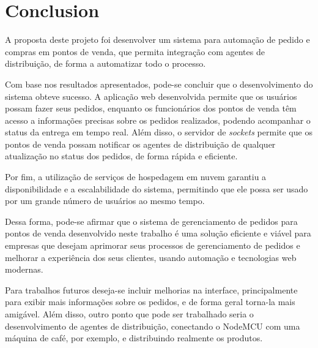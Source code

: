 \chapter{Conclusion}\label{cap:conclusao}



A proposta deste projeto foi desenvolver um sistema para automação de pedido e compras em pontos de venda, que permita integração com agentes de distribuição, de forma a automatizar todo o processo.

Com base nos resultados apresentados, pode-se concluir que o desenvolvimento do sistema obteve sucesso. A aplicação web desenvolvida permite que os usuários possam fazer seus pedidos, enquanto os funcionários dos pontos de venda têm acesso a informações precisas sobre os pedidos realizados, podendo acompanhar o status da entrega em tempo real. Além disso, o servidor de \textit{sockets} permite que os pontos de venda possam notificar os agentes de distribuição de qualquer atualização no status dos pedidos, de forma rápida e eficiente.

Por fim, a utilização de serviços de hospedagem em nuvem garantiu a disponibilidade e a escalabilidade do sistema, permitindo que ele possa ser usado por um grande número de usuários ao mesmo tempo.

Dessa forma, pode-se afirmar que o sistema de gerenciamento de pedidos para pontos de venda desenvolvido neste trabalho é uma solução eficiente e viável para empresas que desejam aprimorar seus processos de gerenciamento de pedidos e melhorar a experiência dos seus clientes, usando automação e tecnologias web modernas.

Para trabalhos futuros deseja-se incluir melhorias na interface, principalmente para exibir mais informações sobre os pedidos, e de forma geral torna-la mais amigável. Além disso, outro ponto que pode ser trabalhado seria o desenvolvimento de agentes de distribuição, conectando o NodeMCU com uma máquina de café, por exemplo, e distribuindo realmente os produtos.